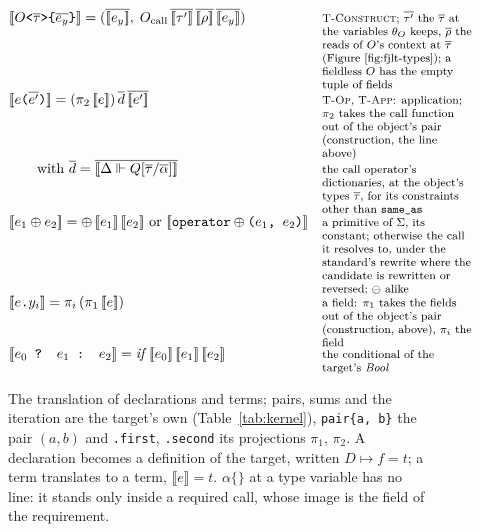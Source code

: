 \begin{figure}[htbp]
\[\begin{array}{@{}l@{\quad}l@{}}
\llbracket O\texttt{<}\overline{\tau}\texttt{>\{}\overline{e_y}\texttt{\}} \rrbracket = (\overline{\llbracket e_y \rrbracket},\; O_{\mathrm{call}}\,\overline{\llbracket \tau' \rrbracket}\,\overline{\llbracket \rho \rrbracket}\,\overline{\llbracket e_y \rrbracket}) & \note{\textsc{T-Construct}; $\overline{\tau'}$ the $\overline{\tau}$ at the variables $\theta_O$ keeps, $\overline{\rho}$ the reads of $O$'s context at $\overline{\tau}$ (Figure~\ref{fig:fjlt-types}); a fieldless $O$ has the empty tuple of fields} \\
\llbracket e\texttt{(}\overline{e'}\texttt{)} \rrbracket = (\pi_2\,\llbracket e \rrbracket)\,\overline{d}\,\overline{\llbracket e' \rrbracket} & \note{\textsc{T-Op}, \textsc{T-App}: application; $\pi_2$ takes the call function out of the object's pair (construction, the line above)} \\
\qquad \text{with } \overline{d} = \overline{\llbracket \Delta \Vdash Q[\overline{\tau}/\overline{\alpha}] \rrbracket} & \note{the call operator's dictionaries, at the object's types $\overline{\tau}$, for its constraints other than \texttt{same\_as}} \\
\llbracket e_1 \oplus e_2 \rrbracket = \oplus\,\llbracket e_1 \rrbracket\,\llbracket e_2 \rrbracket \text{ or } \llbracket \texttt{operator}\oplus\texttt{(}e_1\texttt{, }e_2\texttt{)} \rrbracket & \note{a primitive of $\Sigma$, its constant; otherwise the call it resolves to, under the standard's rewrite where the candidate is rewritten or reversed; $\ominus$ alike} \\
\llbracket e\texttt{.}y_i \rrbracket = \pi_i\,(\pi_1\,\llbracket e \rrbracket) & \note{a field: $\pi_1$ takes the fields out of the object's pair (construction, above), $\pi_i$ the field} \\
\llbracket e_0 \texttt{ ? } e_1 \texttt{ : } e_2 \rrbracket = \mathit{if}\,\llbracket e_0 \rrbracket\,\llbracket e_1 \rrbracket\,\llbracket e_2 \rrbracket & \note{the conditional of the target's \textit{Bool}} \\
\end{array}
\]
\caption{The translation of declarations and terms; pairs, sums and the iteration are the target's own (Table~\ref{tab:kernel}), \texttt{pair\{a, b\}} the pair $(a, b)$ and \texttt{.first}, \texttt{.second} its projections $\pi_1$, $\pi_2$.
A declaration becomes a definition of the target, written $D \mapsto f = t$; a term translates to a term, $\llbracket e \rrbracket = t$.
$\alpha\texttt{\{\}}$ at a type variable has no line: it stands only inside a required call, whose image is the field of the requirement.}
\label{fig:fjlt-translation}
\end{figure}

